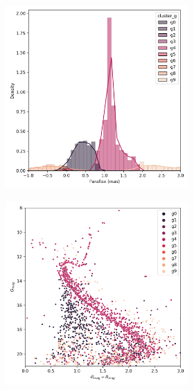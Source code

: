 \documentclass[11pt, a4paper, english]{book}
\begin{document}
\begin{figure}[H]
\begin{subfigure}{0.9\textwidth}
\begin{subfigure}[t]{0.30\textwidth}
    \end{subfigure}
    \hfill
    \begin{subfigure}[t]{0.30\textwidth}
      \centering
      \includegraphics[width=\textwidth]{../figures/ngc_2682/kmeans_parallax_ngc_2682.png}
    \end{subfigure}
    \hfill
    \begin{subfigure}[t]{0.30\textwidth}
      \centering
      \includegraphics[width=\textwidth]{../figures/ngc_2682/kmeans_hr_diagram_ngc_2682.png}

\end{subfigure}
\end{subfigure}
\end{figure}
\end{document}
